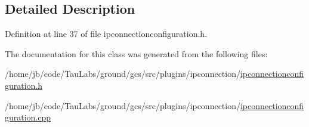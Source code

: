 \subsection{\-Detailed \-Description}


\-Definition at line 37 of file ipconnectionconfiguration.\-h.



\-The documentation for this class was generated from the following files\-:\begin{DoxyCompactItemize}
\item 
/home/jb/code/\-Tau\-Labs/ground/gcs/src/plugins/ipconnection/\hyperlink{ipconnectionconfiguration_8h}{ipconnectionconfiguration.\-h}\item 
/home/jb/code/\-Tau\-Labs/ground/gcs/src/plugins/ipconnection/\hyperlink{ipconnectionconfiguration_8cpp}{ipconnectionconfiguration.\-cpp}\end{DoxyCompactItemize}
